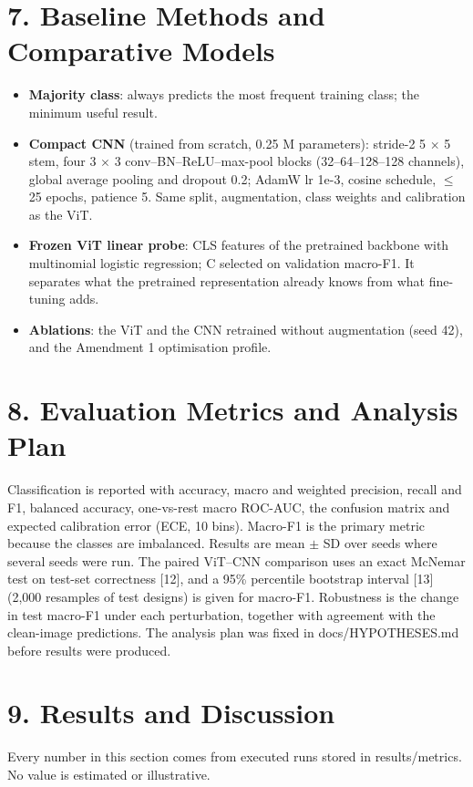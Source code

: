\documentclass[11pt,a4paper]{article}
\begin{document}
\section*{7. Baseline Methods and Comparative Models}
\begin{itemize}[leftmargin=*,itemsep=1pt]
\item \textbf{Majority class}: always predicts the most frequent training class; the minimum useful result.
\item \textbf{Compact CNN} (trained from scratch, 0.25 M parameters): stride-2 5 $\times$ 5 stem, four 3 $\times$ 3 conv--BN--ReLU--max-pool blocks (32--64--128--128 channels), global average pooling and dropout 0.2; AdamW lr 1e-3, cosine schedule, $\leq$ 25 epochs, patience 5. Same split, augmentation, class weights and calibration as the ViT.
\item \textbf{Frozen ViT linear probe}: CLS features of the pretrained backbone with multinomial logistic regression; C selected on validation macro-F1. It separates what the pretrained representation already knows from what fine-tuning adds.
\item \textbf{Ablations}: the ViT and the CNN retrained without augmentation (seed 42), and the Amendment 1 optimisation profile.
\end{itemize}
\section*{8. Evaluation Metrics and Analysis Plan}
Classification is reported with accuracy, macro and weighted precision, recall and F1, balanced accuracy, one-vs-rest macro ROC-AUC, the confusion matrix and expected calibration error (ECE, 10 bins). Macro-F1 is the primary metric because the classes are imbalanced. Results are mean $\pm$ SD over seeds where several seeds were run. The paired ViT--CNN comparison uses an exact McNemar test on test-set correctness [12], and a 95\% percentile bootstrap interval [13] (2,000 resamples of test designs) is given for macro-F1. Robustness is the change in test macro-F1 under each perturbation, together with agreement with the clean-image predictions. The analysis plan was fixed in docs/HYPOTHESES.md before results were produced.

\section*{9. Results and Discussion}
Every number in this section comes from executed runs stored in results/metrics. No value is estimated or illustrative.
\end{document}
